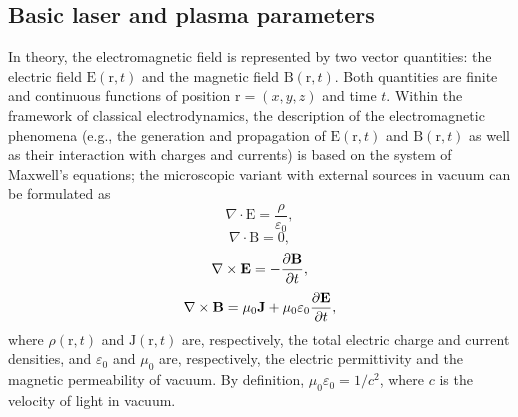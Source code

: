 \documentclass[10pt, a4paper, twoside, openright]{report}
\renewcommand{\vec}[1]{\boldsymbol{\mathrm{#1}}}
\newcommand{\rot}[1]{\nabla \times #1}
\renewcommand{\div}[1]{\nabla \cdot #1}
\begin{document}
%

%

\subsection{Basic laser and plasma parameters}

In theory, the electromagnetic field is represented by two vector quantities: the electric field $ \vec{E} \left( \vec{r}, t \right) $ and the magnetic field $ \vec{B} \left( \vec{r}, t \right) $. Both quantities are finite and continuous functions of position $ \vec{r} = \left( x, y, z \right) $ and time $ t $. Within the framework of classical electrodynamics, the description of the electromagnetic phenomena (e.g., the generation and propagation of $ \vec{E} \left( \vec{r}, t \right) $ and $ \vec{B} \left( \vec{r}, t \right) $ as well as their interaction with charges and currents) is based on the system of Maxwell's equations; the microscopic variant with external sources in vacuum can be formulated as
\begin{equation}\label{eq:gauss_law_for_e}
	\div{\vec{E}} = \frac{\rho}{\varepsilon_0},
\end{equation}
\begin{equation}\label{eq:gauss_law_for_b}
	\div{\vec{B}} = 0,
\end{equation}
\begin{equation}\label{eq:faraday_law}
	\rot{\vec{E}} = -\diffp{\vec{B}}{t},
\end{equation}
\begin{equation}\label{eq:ampere_law}
	\rot{\vec{B}} = \mu_0 \vec{J} + \mu_0 \varepsilon_0 \diffp{\vec{E}}{t},
\end{equation}
where $ \rho \left( \vec{r}, t \right) $ and $ \vec{J} \left( \vec{r}, t \right) $ are, respectively, the total electric charge and current densities, and $ \varepsilon_0 $ and $ \mu_0 $ are, respectively, the electric permittivity and the magnetic permeability of vacuum. By definition, $ \mu_0 \varepsilon_0 = 1 / c^2 $, where $ c $ is the velocity of light in vacuum.
\end{document}
